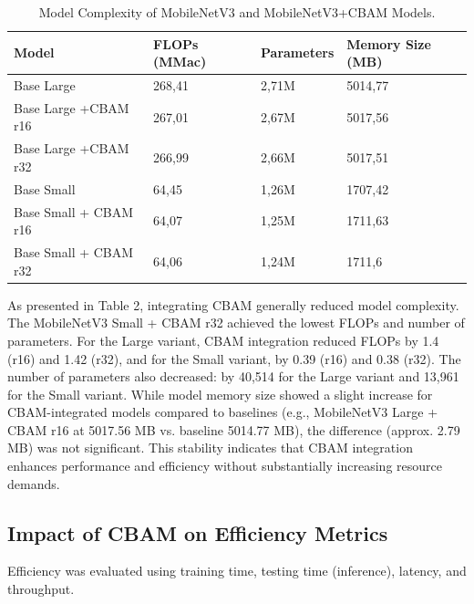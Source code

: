 \documentclass[preprint,12pt]{elsarticle}
\begin{document}
\begin{table}[t]
    \centering
    \begin{tabularx}{\textwidth}{|l|X|X|X|}
        \hline
        \textbf{Model} & \textbf{FLOPs (MMac)} & \textbf{Parameters} & \textbf{Memory Size (MB)} \\
        \hline
        Base Large & 268,41 & 2,71M & 5014,77 \\
        Base Large +CBAM r16 & 267,01 & 2,67M & 5017,56 \\
        Base Large +CBAM r32 & 266,99 & 2,66M & 5017,51 \\
        \hline
        Base Small & 64,45 & 1,26M & 1707,42 \\
        Base Small + CBAM r16 & 64,07 & 1,25M & 1711,63 \\
        Base Small + CBAM r32 & 64,06 & 1,24M & 1711,6 \\
        \hline
    \end{tabularx}
    \caption{Model Complexity of MobileNetV3 and MobileNetV3+CBAM Models.}
    \label{tab:complexity-result}
\end{table}

As presented in Table 2, integrating CBAM generally reduced model complexity. The MobileNetV3 Small + CBAM r32 achieved the lowest FLOPs and number of parameters. For the Large variant, CBAM integration reduced FLOPs by 1.4 (r16) and 1.42 (r32), and for the Small variant, by 0.39 (r16) and 0.38 (r32). The number of parameters also decreased: by 40,514 for the Large variant and 13,961 for the Small variant. While model memory size showed a slight increase for CBAM-integrated models compared to baselines (e.g., MobileNetV3 Large + CBAM r16 at 5017.56 MB vs. baseline 5014.77 MB), the difference (approx. 2.79 MB) was not significant. This stability indicates that CBAM integration enhances performance and efficiency without substantially increasing resource demands.

\subsection{Impact of CBAM on Efficiency Metrics}

Efficiency was evaluated using training time, testing time (inference), latency, and throughput.
\end{document}
